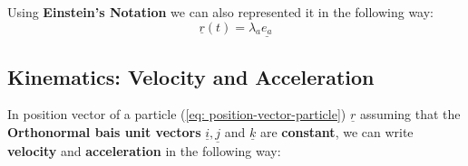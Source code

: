 \begin{note}

	Using {\bf Einstein's Notation} we can also represented it in the following way:
	$$\underline{r}(t) = \lambda_{a}\underline{e_{a}}$$

\end{note}

\subsection{Kinematics: Velocity and Acceleration}
In position vector of a particle (\ref{eq: position-vector-particle})  $\underline{r}$ assuming that the {\bf Orthonormal bais unit vectors} $\underline{i}, \underline{j}$ and $\underline{k}$ are {\bf constant}, we can write {\bf velocity} and {\bf acceleration} in the following way:

\clearpage

